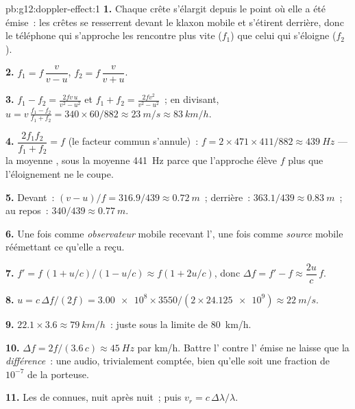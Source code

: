 \begin{solution}{pb:g12:doppler-effect:1}
\textbf{1.} Chaque crête s'élargit depuis le point où elle a été émise~: les crêtes se
resserrent devant le klaxon mobile et s'étirent derrière, donc le téléphone qui s'approche
les rencontre plus vite ($f_1$) que celui qui s'éloigne ($f_2$).

\textbf{2.} $f_1 = f\,\dfrac{v}{v - u}$, \quad $f_2 = f\,\dfrac{v}{v + u}$.

\textbf{3.} $f_1 - f_2 = \frac{2fv\,u}{v^2 - u^2}$ et $f_1 + f_2 =
\frac{2fv^2}{v^2 - u^2}$~; en divisant, $u = v\,\frac{f_1 - f_2}{f_1 + f_2} =
340 \times 60/882 \approx \qty{23}{m/s} \approx \qty{83}{km/h}$.

\textbf{4.} $\dfrac{2f_1 f_2}{f_1 + f_2} = f$ (le facteur commun s'annule)~:
$f = 2 \times 471 \times 411/882 \approx \qty{439}{Hz}$ --- la moyenne
, sous la moyenne \qty{441}{Hz} parce que l'approche
élève $f$ plus que l'éloignement ne le coupe.

\textbf{5.} Devant~: $(v - u)/f = 316.9/439 \approx \qty{0.72}{m}$~; derrière~:
$363.1/439 \approx \qty{0.83}{m}$~; au repos~: $340/439 \approx \qty{0.77}{m}$.

\textbf{6.} Une fois comme \emph{observateur} mobile recevant l', une fois comme
\emph{source} mobile réémettant ce qu'elle a reçu.

\textbf{7.} $f' = f\,(1 + u/c)/(1 - u/c) \approx f(1 + 2u/c)$, donc
$\Delta f = f' - f \approx \dfrac{2u}{c}\,f$.

\textbf{8.} $u = c\,\Delta f/(2f) = \num{3.00e8} \times 3550/(2 \times \num{24.125e9})
\approx \qty{22}{m/s}$.

\textbf{9.} $22.1 \times 3.6 \approx \qty{79}{km/h}$~: juste sous la limite de
\qty{80}{km/h}.

\textbf{10.} $\Delta f = 2f/(3.6\,c) \approx \qty{45}{Hz}$ par \unit{km/h}. Battre
l' contre l' émise ne laisse que la
\emph{différence}~: une  audio, trivialement comptée, bien
qu'elle soit une fraction de $10^{-7}$ de la porteuse.

\textbf{11.} Les  de 
connues, nuit après nuit~; puis $v_r = c\,\Delta\lambda/\lambda$.


\end{solution}

